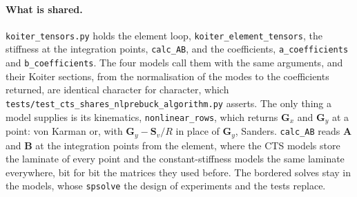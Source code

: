 \documentclass[11pt,a4paper]{article}
\begin{document}
\paragraph{What is shared.}  \texttt{koiter\_tensors.py} holds the element
loop, \texttt{koiter\_element\_tensors}, the stiffness at the integration
points, \texttt{calc\_AB}, and the coefficients, \texttt{a\_coefficients} and
\texttt{b\_coefficients}.  The four models call them with the same arguments,
and their Koiter sections, from the normalisation of the modes to the
coefficients returned, are identical character for character, which
\texttt{tests/test\_cts\_shares\_nlprebuck\_algorithm.py} asserts.  The only
thing a model supplies is its kinematics, \texttt{nonlinear\_rows}, which
returns $\boldsymbol{G}_x$ and $\boldsymbol{G}_y$ at a point: von Karman or,
with $\boldsymbol{G}_y - \boldsymbol{S}_v/R$ in place of $\boldsymbol{G}_y$,
Sanders.  \texttt{calc\_AB} reads $\boldsymbol{A}$ and $\boldsymbol{B}$ at the
integration points from the element, where the CTS models store the laminate
of every point and the constant-stiffness models the same laminate
everywhere, bit for bit the matrices they used before.  The bordered solves
stay in the models, whose \texttt{spsolve} the design of experiments and the
tests replace.
\end{document}
